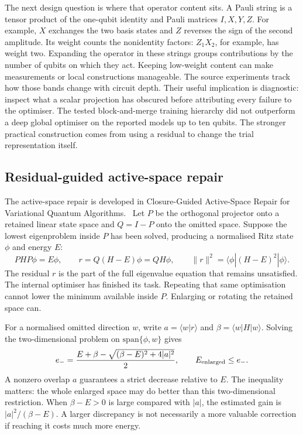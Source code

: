 The next design question is where that operator content sits. A Pauli string is a tensor product of the one-qubit identity and Pauli matrices $I,X,Y,Z$. For example, $X$ exchanges the two basis states and $Z$ reverses the sign of the second amplitude. Its weight counts the nonidentity factors: $Z_1X_2$, for example, has weight two. Expanding the operator in these strings groups contributions by the number of qubits on which they act. Keeping low-weight content can make measurements or local constructions manageable. The source experiments track how those bands change with circuit depth. Their useful implication is diagnostic: inspect what a scalar projection has obscured before attributing every failure to the optimiser. The tested block-and-merge training hierarchy did not outperform a deep global optimiser on the reported models up to ten qubits. The stronger practical construction comes from using a residual to change the trial representation itself.

\subsection{Residual-guided active-space repair}
The active-space repair is developed in Closure-Guided Active-Space Repair for Variational Quantum Algorithms.~\cite{McCaul8cce8c} Let $P$ be the orthogonal projector onto a retained linear state space and $Q=I-P$ onto the omitted space. Suppose the lowest eigenproblem inside $P$ has been solved, producing a normalised Ritz state $\phi$ and energy $E$:
\begin{equation}
 PHP\phi=E\phi,\qquad r=Q(H-E)\phi=QH\phi,\qquad \|r\|^2=\langle\phi|(H-E)^2|\phi\rangle.
 \label{eq:ritz-residual}
\end{equation}
The residual $r$ is the part of the full eigenvalue equation that remains unsatisfied. The internal optimiser has finished its task. Repeating that same optimisation cannot lower the minimum available inside $P$. Enlarging or rotating the retained space can.

For a normalised omitted direction $w$, write $a=\langle w|r\rangle$ and $\beta=\langle w|H|w\rangle$. Solving the two-dimensional problem on $\mathrm{span}\{\phi,w\}$ gives
\begin{equation}
 e_-=\frac{E+\beta-\sqrt{(\beta-E)^2+4|a|^2}}{2},\qquad E_{\rm enlarged}\leq e_-.
 \label{eq:ritz-descent}
\end{equation}
A nonzero overlap $a$ guarantees a strict decrease relative to $E$. The inequality matters: the whole enlarged space may do better than this two-dimensional restriction. When $\beta-E>0$ is large compared with $|a|$, the estimated gain is $|a|^2/(\beta-E)$. A larger discrepancy is not necessarily a more valuable correction if reaching it costs much more energy.

